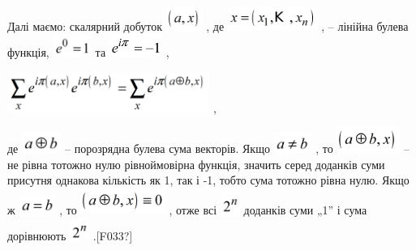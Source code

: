 \documentclass[a4paper]{article}
\newcounter{}
\begin{document}
Далі маємо: скалярний добуток 
\includegraphics[width=0.4681in,height=0.3055in]{crypt-img/crypt-img138.png} ,
де 
\includegraphics[width=1.1535in,height=0.3075in]{crypt-img/crypt-img139.png} ,
– лінійна булева функція,  
\includegraphics[width=0.4953in,height=0.2862in]{crypt-img/crypt-img140.png} 
та 
\includegraphics[width=0.6811in,height=0.2917in]{crypt-img/crypt-img141.png} ,

{\centering
 \includegraphics[width=2.598in,height=0.5193in]{crypt-img/crypt-img142.png} ,
\par}

де  \includegraphics[width=0.5043in,height=0.2634in]{crypt-img/crypt-img143.png}
 – порозрядна булева сума векторів. Якщо 
\includegraphics[width=0.4898in,height=0.25in]{crypt-img/crypt-img144.png} , то
 \includegraphics[width=0.8126in,height=0.3335in]{crypt-img/crypt-img145.png} 
– не рівна тотожно нулю рівноймовірна функція, значить серед доданків суми
присутня однакова кількість як 1, так і -1, тобто сума тотожно рівна нулю. Якщо
ж  \includegraphics[width=0.472in,height=0.2508in]{crypt-img/crypt-img146.png}
, то 
\includegraphics[width=1.0866in,height=0.3307in]{crypt-img/crypt-img147.png} , 
отже всі 
\includegraphics[width=0.2516in,height=0.2917in]{crypt-img/crypt-img148.png}
доданків  суми „1”  і сума дорівнюють 
\includegraphics[width=0.2516in,height=0.2957in]{crypt-img/crypt-img149.png}
.\textlatin{[F033?]}
\end{document}
